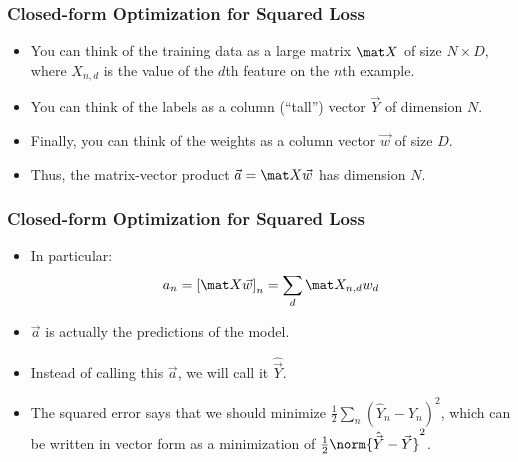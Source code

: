 \documentclass[trans,aspectratio=169]{beamer}
\begin{document}
\begin{frame}
  \frametitle{Closed-form Optimization for Squared Loss}
\begin{itemize}
\item 
You can think of the training data as a large matrix $\mat X$ of size
$N \times D$, where $X_{n,d}$ is the value of the $d$th feature on the
$n$th example. 
\item  You can think of the labels as a column (``tall'')
vector $\vec Y$ of dimension $N$.
\item  Finally, you can think of the
weights as a column vector $\vec w$ of size $D$. 
\item Thus, the
matrix-vector product $\vec a = \mat X \vec w$ has dimension $N$.
\end{itemize}
\end{frame}

\begin{frame}
  \frametitle{Closed-form Optimization for Squared Loss}
\begin{itemize}
\item 
  In
particular:
%
\begin{equation}
a_n
= \left[ \mat X \vec w \right]_n 
= \sum_d \mat X_{n,d} w_d
\end{equation}
%
\item  $\vec a$ is actually the predictions
of the model.
\item  Instead of calling this $\vec a$, we will call it
$\hat{\vec Y}$. 
\item The squared error says that we should minimize $\frac 1
2 \sum_n (\hat Y_n - Y_n)^2$, which can be written in vector form as a
minimization of $\frac 1 2 \norm{\hat{\vec Y} - \vec Y}^2$.
\end{itemize}
\end{frame}
\end{document}
